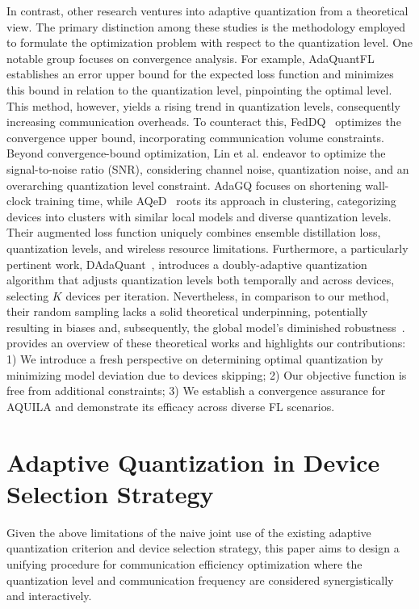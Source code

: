 \documentclass[lettersize,journal]{IEEEtran}
\begin{document}
In contrast, other research ventures into adaptive quantization from a theoretical view. The primary distinction among these studies is the methodology employed to formulate the optimization problem with respect to the quantization level.
One notable group focuses on convergence analysis. For example, AdaQuantFL~\cite{jhunjhunwala2021adaptive} establishes an error upper bound for the expected loss function and minimizes this bound in relation to the quantization level, pinpointing the optimal level. This method, however, yields a rising trend in quantization levels, consequently increasing communication overheads. To counteract this, FedDQ~\cite{qu2022feddq} optimizes the convergence upper bound, incorporating communication volume constraints.
Beyond convergence-bound optimization, Lin et al.\cite{lin2021channel} endeavor to optimize the signal-to-noise ratio (SNR), considering channel noise, quantization noise, and an overarching quantization level constraint. AdaGQ\cite{liu2023communication} focuses on shortening wall-clock training time, while AQeD~\cite{liu2022ensemble} roots its approach in clustering, categorizing devices into clusters with similar local models and diverse quantization levels. Their augmented loss function uniquely combines ensemble distillation loss, quantization levels, and wireless resource limitations.
Furthermore, a particularly pertinent work, DAdaQuant~\cite{honig2022dadaquant}, introduces a doubly-adaptive quantization algorithm that adjusts quantization levels both temporally and across devices, selecting $K$ devices per iteration. 
Nevertheless, in comparison to our method, their random sampling lacks a solid theoretical underpinning, potentially resulting in biases and, subsequently, the global model's diminished robustness~\cite{cho2020client}.  provides an overview of these theoretical works and highlights our contributions: 1) We introduce a fresh perspective on determining optimal quantization by minimizing model deviation due to devices skipping; 2) Our objective function is free from additional constraints; 3) We establish a convergence assurance for AQUILA and demonstrate its efficacy across diverse FL scenarios.

\section{Adaptive Quantization in Device Selection Strategy}
Given the above limitations of the naive joint use of the existing adaptive quantization criterion and device selection strategy, this paper aims to design a unifying procedure for communication efficiency optimization where the quantization level and communication frequency are considered synergistically and interactively.
\end{document}
